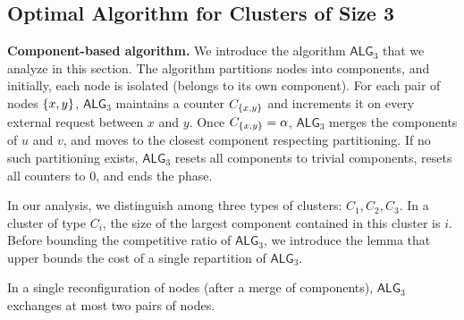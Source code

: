 \documentclass[a4paper,anonymous,USenglish]{lipics-v2019}
\newcommand{\TAlg}{{\ensuremath{\textsf{ALG}_{3}}}\xspace}
\DeclarePairedDelimiter\set{\{}{\}}
\begin{document}
\subsection{Optimal Algorithm for Clusters of Size 3}
\label{sec:k3}




\noindent
\textbf{Component-based algorithm.}
We introduce the algorithm \TAlg that we analyze in this section.
The algorithm partitions nodes into components, and
initially, each node is isolated (belongs to its own component).
For each pair of nodes $\set{x,y}$, \TAlg maintains a counter $C_{\set{x,y}}$ and increments it on every external request between $x$ and $y$.
Once $C_{\set{x,y}} = \alpha$, \TAlg merges the components of $u$ and $v$, and moves to the closest component respecting partitioning.
If no such partitioning exists, \TAlg resets all components to trivial components, resets all counters to $0$, and ends the phase.



In our analysis, we distinguish among three types of clusters: $C_1, C_2, C_3$. In a cluster of type $C_i$, the size of the largest component contained in this cluster is $i$.
Before bounding the competitive ratio of \TAlg, we introduce the lemma that upper bounds the cost of a single repartition of \TAlg.

\begin{lemma}
	\label{lem:1req}
	In a single reconfiguration of nodes (after a merge of components), \TAlg exchanges at most two pairs of nodes.
\end{lemma}
\end{document}
